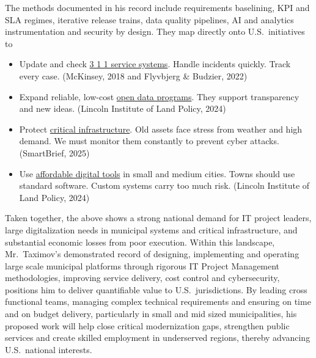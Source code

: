 The methods documented in his record include requirements baselining, KPI and SLA regimes, iterative release trains, data quality pipelines, AI and analytics instrumentation and security by design. They map directly onto U.S.\ initiatives to

\vspace{-0.5\baselineskip}
\begin{itemize}[nosep]

  \item Update and check \underline{3 1 1 service systems}. Handle incidents quickly. Track every case. (McKinsey, 2018 and Flyvbjerg \& Budzier, 2022)

  \item Expand reliable, low-cost \underline{open data programs}. They support transparency and new ideas. (Lincoln Institute of Land Policy, 2024) 

\item Protect \underline{critical infrastructure}. Old assets face stress from weather and high demand. We must monitor them constantly to prevent cyber attacks. (SmartBrief, 2025) 

\item Use \underline{affordable digital tools} in small and medium cities. Towns should use standard software. Custom systems carry too much risk. (Lincoln Institute of Land Policy, 2024) 

\end{itemize}

Taken together, the above shows a strong national demand for IT project leaders, large digitalization needs in municipal systems and critical infrastructure, and substantial economic losses from poor execution. Within this landscape, Mr.~Taximov’s demonstrated record of designing, implementing and operating large scale municipal platforms through rigorous IT Project Management methodologies, improving service delivery, cost control and cybersecurity, positions him to deliver quantifiable value to U.S.\ jurisdictions. By leading cross functional teams, managing complex technical requirements and ensuring on time and on budget delivery, particularly in small and mid sized municipalities, his proposed work will help close critical modernization gaps, strengthen public services and create skilled employment in underserved regions, thereby advancing U.S.\ national interests.
